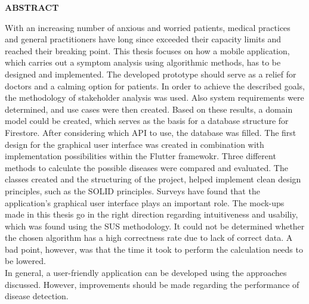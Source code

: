 

{
	\raggedbottom
	\centering
	\vspace{0.9cm}
	\large
	\textbf{ABSTRACT}
		\vspace*{\fill}
		
		With an increasing number of anxious and worried patients, medical practices and general practitioners have long since exceeded their capacity limits and reached their breaking point.
		This thesis focuses on how a mobile application, which carries out a symptom analysis using algorithmic methods, has to be designed and implemented. The developed prototype should serve as a relief for doctors and a calming option for patients. In order to achieve the described goals, the methodology of stakeholder analysis was used. Also system requirements were determined, and use cases were then created. Based on these results, a domain model could be created, which serves as the basis for a database structure for Firestore. After considering which API to use, the database was filled. The first design for the graphical user interface was created in combination with implementation possibilities within the Flutter framewokr. Three different methods to calculate the possible diseases were compared and evaluated. The classes created and the structuring of the project, helped implement clean design principles, such as the SOLID principles. Surveys have found that the application's graphical user interface plays an important role. The mock-ups made in this thesis go in the right direction regarding intuitiveness and usabiliy, which was found using the SUS methodology. It could not be determined whether the chosen algorithm has a high correctness rate due to lack of correct data. A bad point, however, was that the time it took to perform the calculation needs to be lowered.
		\newline \\
		In general, a user-friendly application can be developed using the approaches discussed. However, improvements should be made regarding the performance of disease detection.
	
	\vspace*{\fill}
	\pagebreak

	\vspace{0.9cm}
	\large
	
}
